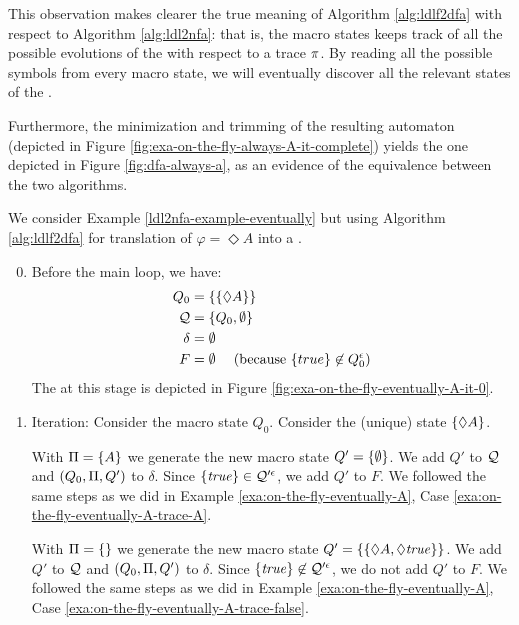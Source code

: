 \begin{example}
This observation makes clearer the true meaning of Algorithm \ref{alg:ldlf2dfa} with respect to Algorithm \ref{alg:ldl2nfa}: that is, the macro states keeps track of all the possible evolutions of the \NFA with respect to a trace $\pi$. By reading all the possible symbols from every macro state, we will eventually discover all the relevant states of the \DFA.

Furthermore, the minimization and trimming of the resulting automaton (depicted in Figure \ref{fig:exa-on-the-fly-always-A-it-complete}) yields the one depicted in Figure \ref{fig:dfa-always-a}, as an evidence of the equivalence between the two algorithms.
\end{example}

\clearpage
\begin{example}
	We consider Example \ref{ldl2nfa-example-eventually} but using Algorithm \ref{alg:ldlf2dfa} for translation of $\varphi = \Diamond A$ into a \DFA.
	
	\begin{enumerate}
		\setcounter{enumi}{-1}
		\item Before the main loop, we have:
		\begin{align*}
		Q_0 &= \{\{\Diamond A\}\}\\
		\mathcal{Q}  &= \{Q_0, \emptyset\}\\
		\delta &= \emptyset\\
		F &= \emptyset \hspace*{.18in} (\text{because } \{true\}\not\in Q_0^\epsilon)
		\end{align*}
		The \DFA at this stage is depicted in Figure \ref{fig:exa-on-the-fly-eventually-A-it-0}.
		
		\item Iteration: Consider the macro state $Q_0$. Consider the (unique) \NFA state $\{\Diamond A\}$. 
		
		With $\Pi = \{A\}$ we generate the new macro state $Q' = \{\emptyset\}$. We add $Q'$ to $\mathcal{Q}$ and $(Q_0, \Pi, Q')$ to $\delta$. Since $\{\mathit{true}\}\in\mathcal{Q}'^\epsilon$, we add $Q'$ to $F$. We followed the same steps as we did in Example \ref{exa:on-the-fly-eventually-A}, Case \ref{exa:on-the-fly-eventually-A-trace-A}.
		
		With $\Pi = \{\}$ we generate the new macro state $Q' =\{\{\Diamond A, \Diamond \mathit{true}\}\}$. We add $Q'$ to $\mathcal{Q}$ and $(Q_0, \Pi, Q')$ to $\delta$. Since $\{\mathit{true}\}\not\in\mathcal{Q}'^\epsilon$, we do not add $Q'$ to $F$. We followed the same steps as we did in Example \ref{exa:on-the-fly-eventually-A}, Case \ref{exa:on-the-fly-eventually-A-trace-false}.
		

\end{enumerate}
\end{example}
